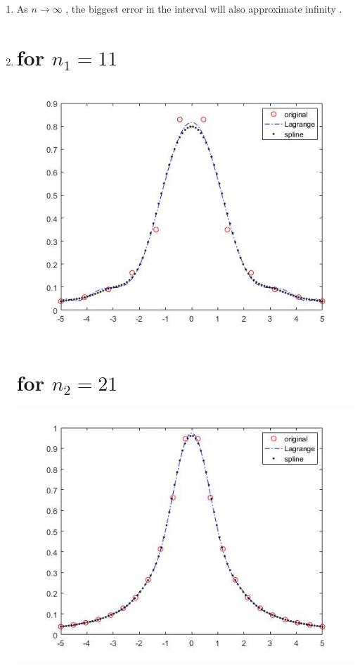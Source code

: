 \documentclass[12pt]{article}
\begin{document}
\begin{enumerate}
\begin{enumerate}
            \item %
            As $n \to \infty$ , the biggest error in the interval will also approximate infinity .  
            
            \item %
                \section*{for $n_1 = 11$}
                
                \includegraphics[width=5in]{c11.jpg}\\
                \section*{for $n_2 = 21$}
                
                \includegraphics[width=5in]{c21.jpg}\\
        \end{enumerate}
\end{enumerate}
\end{document}
